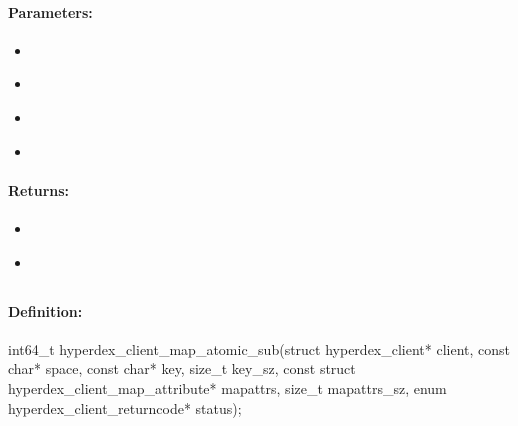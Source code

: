 \paragraph{Parameters:}
\begin{itemize}[noitemsep]
\item {}\\

\item {}\\

\item {}\\

\item {}\\

\end{itemize}

\paragraph{Returns:}
\begin{itemize}[noitemsep]
\item {}\\

\item {}\\

\end{itemize}

\pagebreak
\subsection{}
\label{api:c:map_atomic_sub}


\paragraph{Definition:}
\begin{ccode}
int64_t hyperdex_client_map_atomic_sub(struct hyperdex_client* client,
        const char* space,
        const char* key, size_t key_sz,
        const struct hyperdex_client_map_attribute* mapattrs, size_t mapattrs_sz,
        enum hyperdex_client_returncode* status);
\end{ccode}

